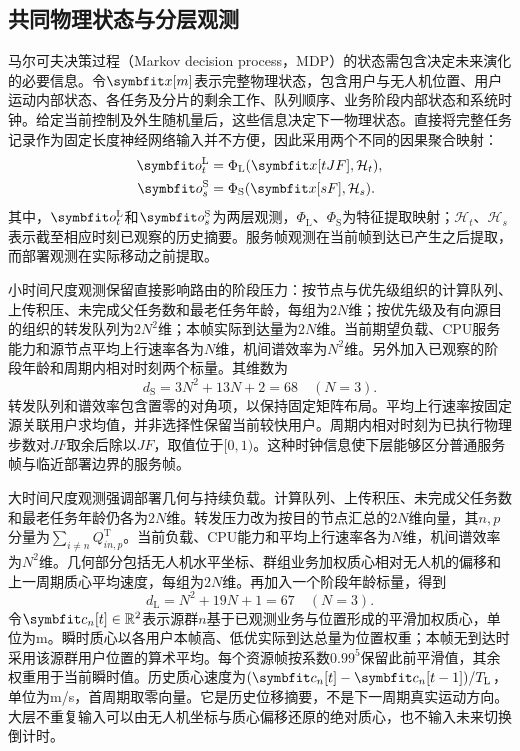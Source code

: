 \subsection{共同物理状态与分层观测}
马尔可夫决策过程（Markov decision process，MDP）的状态需包含决定未来演化的必要信息。令$\vct x[m]$表示完整物理状态，包含用户与无人机位置、用户运动内部状态、各任务及分片的剩余工作、队列顺序、业务阶段内部状态和系统时钟。给定当前控制及外生随机量后，这些信息决定下一物理状态。直接将完整任务记录作为固定长度神经网络输入并不方便，因此采用两个不同的因果聚合映射：
\begin{equation}
 \begin{aligned}
 \vct o_t^{\mathrm L}&=\Phi_{\mathrm L}(\vct x[tJF],\mathcal H_t),\\
 \vct o_s^{\mathrm S}&=\Phi_{\mathrm S}(\vct x[sF],\mathcal H_s).
 \end{aligned}
 \label{eq:observations}
\end{equation}
其中，$\vct o_t^{\mathrm L}$和$\vct o_s^{\mathrm S}$为两层观测，$\Phi_{\mathrm L}$、$\Phi_{\mathrm S}$为特征提取映射；$\mathcal H_t$、$\mathcal H_s$表示截至相应时刻已观察的历史摘要。服务帧观测在当前帧到达已产生之后提取，而部署观测在实际移动之前提取。

小时间尺度观测保留直接影响路由的阶段压力：按节点与优先级组织的计算队列、上传积压、未完成父任务数和最老任务年龄，每组为$2N$维；按优先级及有向源目的组织的转发队列为$2N^2$维；本帧实际到达量为$2N$维。当前期望负载、CPU服务能力和源节点平均上行速率各为$N$维，机间谱效率为$N^2$维。另外加入已观察的阶段年龄和周期内相对时刻两个标量。其维数为
\begin{equation}
 d_{\mathrm S}=3N^2+13N+2=68\quad(N=3).
 \label{eq:microdim}
\end{equation}
转发队列和谱效率包含置零的对角项，以保持固定矩阵布局。平均上行速率按固定源关联用户求均值，并非选择性保留当前较快用户。周期内相对时刻为已执行物理步数对$JF$取余后除以$JF$，取值位于$[0,1)$。这种时钟信息使下层能够区分普通服务帧与临近部署边界的服务帧。

大时间尺度观测强调部署几何与持续负载。计算队列、上传积压、未完成父任务数和最老任务年龄仍各为$2N$维。转发压力改为按目的节点汇总的$2N$维向量，其$n,p$分量为$\sum_{i\ne n}Q_{in,p}^{\mathrm T}$。当前负载、CPU能力和平均上行速率各为$N$维，机间谱效率为$N^2$维。几何部分包括无人机水平坐标、群组业务加权质心相对无人机的偏移和上一周期质心平均速度，每组为$2N$维。再加入一个阶段年龄标量，得到
\begin{equation}
 d_{\mathrm L}=N^2+19N+1=67\quad(N=3).
 \label{eq:macrodim}
\end{equation}
令$\vct c_n[t]\in\R^2$表示源群$n$基于已观测业务与位置形成的平滑加权质心，单位为m。瞬时质心以各用户本帧高、低优实际到达总量为位置权重；本帧无到达时采用该源群用户位置的算术平均。每个资源帧按系数$0.99^5$保留此前平滑值，其余权重用于当前瞬时值。历史质心速度为$(\vct c_n[t]-\vct c_n[t-1])/T_{\mathrm L}$，单位为m/s，首周期取零向量。它是历史位移摘要，不是下一周期真实运动方向。大层不重复输入可以由无人机坐标与质心偏移还原的绝对质心，也不输入未来切换倒计时。

